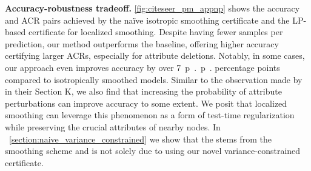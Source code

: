 \documentclass{article} %
\theoremstyle{plain}
\theoremstyle{definition}
\theoremstyle{remark}
\begin{document}
\textbf{Accuracy-robustness tradeoff.}
\autoref{fig:citeseer_pm_appnp} shows the
accuracy and ACR pairs achieved by the na\"ive isotropic smoothing certificate and the LP-based certificate for localized smoothing.
Despite having fewer samples per prediction, our method outperforms the baseline, offering higher accuracy certifying larger ACRs, especially for attribute deletions. Notably, in some cases, our approach even improves accuracy by over \SI{7}{p{.}p{.}} percentage points compared to isotropically smoothed models.
Similar to the observation made by \cite{Bojchevski2020} in their Section K, we also find that increasing the probability of attribute perturbations can improve accuracy to some extent. We posit that localized smoothing can leverage this phenomenon as a form of test-time regularization while preserving the crucial attributes of nearby nodes. In ~\autoref{section:naive_variance_constrained} we show that the stems from the smoothing scheme and is not solely due to using our novel variance-constrained certificate.
\end{document}

